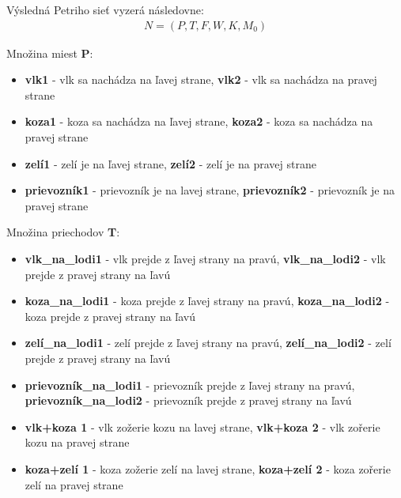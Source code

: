 \documentclass[11pt,a4paper]{article}
\begin{document}
Výsledná Petriho sieť vyzerá následovne\cite{AA}: \\
\begin{align*}
    N = (P, T, F, W, K, M_0)
\end{align*}

Množina miest \textbf{P}:
\begin{itemize}
    \item \textbf{vlk1} - vlk sa nachádza na ľavej strane, \textbf{vlk2} - vlk sa nachádza na pravej strane
    \item \textbf{koza1} - koza sa nachádza na ľavej strane, \textbf{koza2} - koza sa nachádza na pravej strane
    \item \textbf{zelí1} - zelí je na ľavej strane, \textbf{zelí2} - zelí je na pravej strane
    \item \textbf{prievozník1} - prievozník je na lavej strane, \textbf{prievozník2} - prievozník je na pravej strane
\end{itemize}

Množina priechodov \textbf{T}:
\begin{itemize}
    \item \textbf{vlk\_na\_lodi1} - vlk prejde z ľavej strany na pravú, \textbf{vlk\_na\_lodi2} - vlk prejde z pravej strany na ľavú
    \item \textbf{koza\_na\_lodi1} - koza prejde z ľavej strany na pravú, \textbf{koza\_na\_lodi2} - koza prejde z pravej strany na ľavú
    \item \textbf{zelí\_na\_lodi1} - zelí prejde z ľavej strany na pravú, \textbf{zelí\_na\_lodi2} - zelí prejde z pravej strany na ľavú
    \item \textbf{prievozník\_na\_lodi1} - prievozník prejde z ľavej strany na pravú, \textbf{prievozník\_na\_lodi2} - prievozník prejde z pravej strany na ľavú
    \item \textbf{vlk+koza 1} - vlk zožerie kozu na lavej strane, \textbf{vlk+koza 2} - vlk zořerie kozu na pravej strane
    \item \textbf{koza+zelí 1} - koza zožerie zelí na lavej strane, \textbf{koza+zelí 2} - koza zořerie zelí na pravej strane
\end{itemize}
\end{document}
